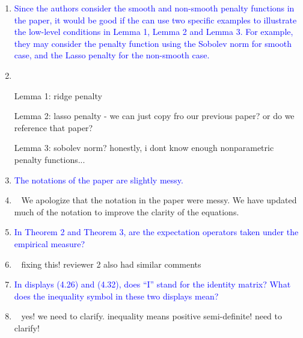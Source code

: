 \documentclass[]{article}
\newcommand{\point}[1]{\item \textcolor{blue}{#1}}
\newcommand{\reply}{\item[]\ }
\begin{document}
\begin{enumerate}
		\point{
			Since the authors consider the smooth and non-smooth penalty functions in the paper, it would be good if the can use two specific examples to illustrate the low-level conditions in Lemma 1, Lemma 2 and Lemma 3. For example, they may consider the penalty function using the Sobolev norm for smooth case, and the Lasso penalty for the non-smooth case.
		}
	
		\reply{
		
			Lemma 1: ridge penalty
		
			Lemma 2: lasso penalty - we can just copy fro our previous paper? or do we reference that paper?
			
			Lemma 3: sobolev norm? honestly, i dont know enough nonparametric penalty functions...
		}
		
		\point{
		The notations of the paper are slightly messy.
		}
	
		\reply{
			We apologize that the notation in the paper were messy. We have updated much of the notation to improve the clarity of the equations.
		}
	
		\point{
			In Theorem 2 and Theorem 3, are the expectation operators taken under the empirical measure?
		}
		\reply{
			fixing this! reviewer 2 also had similar comments
		}
		\point{
		In displays (4.26) and (4.32), does “I” stand for the identity matrix? What does the inequality symbol in these two displays mean?
		}
	
		\reply{
			yes! we need to clarify.
			inequality means positive semi-definite! need to clarify!
		}
	\end{enumerate} 
	
\end{document}
